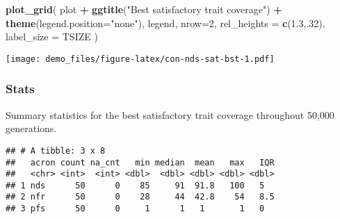 \documentclass[]{book}
\newenvironment{Shaded}{\begin{snugshade}}{\end{snugshade}}
\newcommand{\DataTypeTok}[1]{\textcolor[rgb]{0.13,0.29,0.53}{#1}}
\newcommand{\DecValTok}[1]{\textcolor[rgb]{0.00,0.00,0.81}{#1}}
\newcommand{\FloatTok}[1]{\textcolor[rgb]{0.00,0.00,0.81}{#1}}
\newcommand{\KeywordTok}[1]{\textcolor[rgb]{0.13,0.29,0.53}{\textbf{#1}}}
\newcommand{\NormalTok}[1]{#1}
\newcommand{\OperatorTok}[1]{\textcolor[rgb]{0.81,0.36,0.00}{\textbf{#1}}}
\newcommand{\OtherTok}[1]{\textcolor[rgb]{0.56,0.35,0.01}{#1}}
\newcommand{\StringTok}[1]{\textcolor[rgb]{0.31,0.60,0.02}{#1}}
\begin{document}
\begin{Shaded}
\begin{Highlighting}[]
\KeywordTok{plot_grid}\NormalTok{(}
\NormalTok{  plot }\OperatorTok{+}
\StringTok{    }\KeywordTok{ggtitle}\NormalTok{(}\StringTok{"Best satisfactory trait coverage"}\NormalTok{) }\OperatorTok{+}
\StringTok{    }\KeywordTok{theme}\NormalTok{(}\DataTypeTok{legend.position=}\StringTok{"none"}\NormalTok{),}
\NormalTok{  legend,}
  \DataTypeTok{nrow=}\DecValTok{2}\NormalTok{,}
  \DataTypeTok{rel_heights =} \KeywordTok{c}\NormalTok{(}\FloatTok{1.3}\NormalTok{,.}\DecValTok{32}\NormalTok{),}
  \DataTypeTok{label_size =}\NormalTok{ TSIZE}
\NormalTok{)}
\end{Highlighting}
\end{Shaded}

\texttt{[image: demo\_files/figure-latex/con-nds-sat-bst-1.pdf]}

\hypertarget{stats-8}{%
\subsubsection{Stats}\label{stats-8}}

Summary statistics for the best satisfactory trait coverage throughout 50,000 generations.

\begin{Shaded}
\end{Shaded}

\begin{verbatim}
## # A tibble: 3 x 8
##   acron count na_cnt   min median  mean   max   IQR
##   <chr> <int>  <int> <dbl>  <dbl> <dbl> <dbl> <dbl>
## 1 nds      50      0    85     91  91.8   100   5  
## 2 nfr      50      0    28     44  42.8    54   8.5
## 3 pfs      50      0     1      1   1       1   0
\end{verbatim}
\end{document}
